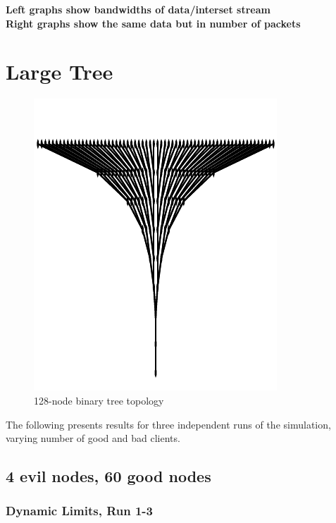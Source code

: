\documentclass[onecolumn]{IEEEtran}
\begin{document}
\tableofcontents

\clearpage

\textbf{\color{red}Left graphs show bandwidths of data/interset stream\\
Right graphs show the same data but in number of packets}

\section{Large Tree}

\begin{figure}[h]
  \centering
  
\includegraphics[scale=1]{selected-results/topo-large-tree.pdf}
  
  \caption{128-node binary tree topology}
\end{figure}


The following presents results for three independent runs of the simulation, varying number of good and bad clients.  

\clearpage

\subsection{\textbf{4 evil nodes}, 60 good nodes}

\subsubsection{Dynamic Limits, Run 1-3}
\end{document}
